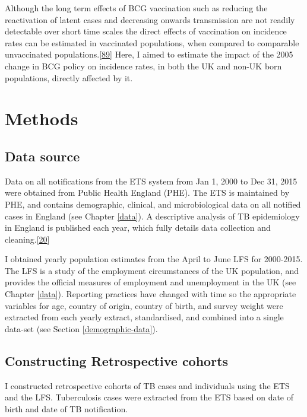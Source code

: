 \documentclass[11pt,twoside]{bristolthesis}
\begin{document}
  Although the long term effects of BCG vaccination such as reducing the reactivation of latent cases and decreasing onwards transmission are not readily detectable over short time scales the direct effects of vaccination on incidence rates can be estimated in vaccinated populations, when compared to comparable unvaccinated populations.{[}\protect\hyperlink{ref-Parikh2016a}{89}{]} Here, I aimed to estimate the impact of the 2005 change in BCG policy on incidence rates, in both the UK and non-UK born populations, directly affected by it.
  
  \hypertarget{methods-1}{%
  \section{Methods}\label{methods-1}}
  
  \hypertarget{data-source}{%
  \subsection{Data source}\label{data-source}}
  
  Data on all notifications from the ETS system from Jan 1, 2000 to Dec 31, 2015 were obtained from Public Health England (PHE). The ETS is maintained by PHE, and contains demographic, clinical, and microbiological data on all notified cases in England (see Chapter \ref{data}). A descriptive analysis of TB epidemiology in England is published each year, which fully details data collection and cleaning.{[}\protect\hyperlink{ref-PHE2016a}{20}{]}
  
  I obtained yearly population estimates from the April to June LFS for 2000-2015. The LFS is a study of the employment circumstances of the UK population, and provides the official measures of employment and unemployment in the UK (see Chapter \ref{data}). Reporting practices have changed with time so the appropriate variables for age, country of origin, country of birth, and survey weight were extracted from each yearly extract, standardised, and combined into a single data-set (see Section \ref{demographic-data}).
  
  \hypertarget{cohort-definition}{%
  \subsection{Constructing Retrospective cohorts}\label{cohort-definition}}
  
  I constructed retrospective cohorts of TB cases and individuals using the ETS and the LFS. Tuberculosis cases were extracted from the ETS based on date of birth and date of TB notification.
  
\end{document}
